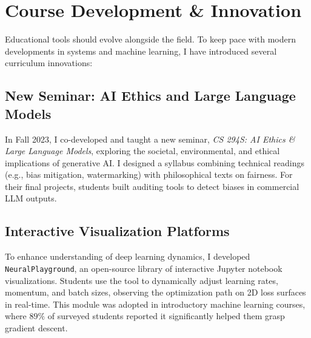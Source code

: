 \section{Course Development \& Innovation}
Educational tools should evolve alongside the field. To keep pace with modern developments in systems and machine learning, I have introduced several curriculum innovations:

\subsection{New Seminar: AI Ethics and Large Language Models}
In Fall 2023, I co-developed and taught a new seminar, \emph{CS 294S: AI Ethics \& Large Language Models}, exploring the societal, environmental, and ethical implications of generative AI. I designed a syllabus combining technical readings (e.g., bias mitigation, watermarking) with philosophical texts on fairness. For their final projects, students built auditing tools to detect biases in commercial LLM outputs.

\subsection{Interactive Visualization Platforms}
To enhance understanding of deep learning dynamics, I developed \texttt{NeuralPlayground}, an open-source library of interactive Jupyter notebook visualizations. Students use the tool to dynamically adjust learning rates, momentum, and batch sizes, observing the optimization path on 2D loss surfaces in real-time. This module was adopted in introductory machine learning courses, where $89\%$ of surveyed students reported it significantly helped them grasp gradient descent.

